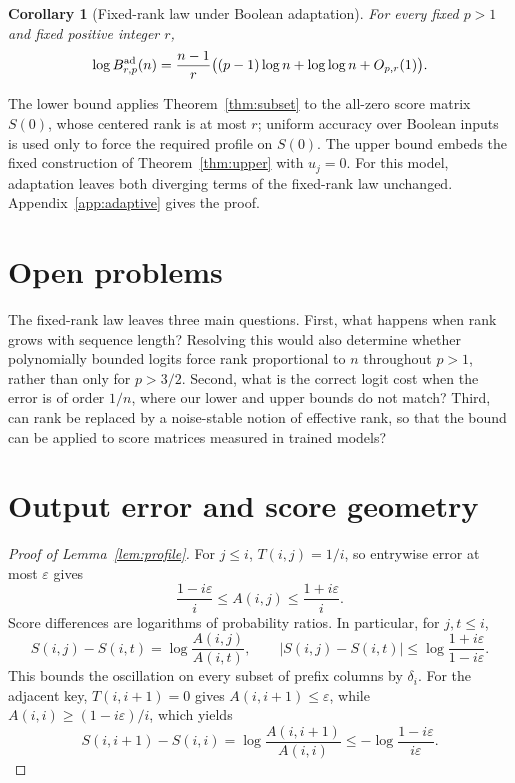 \documentclass[10pt]{article} %
\newtheorem{corollary}[theorem]{Corollary}
\theoremstyle{definition}
\begin{document}
\begin{corollary}[Fixed-rank law under Boolean adaptation]\label{cor:adaptive}
For every fixed \(p>1\) and fixed positive integer \(r\),
\[
 \log B^{\rm ad}_{r,p}(n)
 =\frac{n-1}{r}\bigl((p-1)\log n+\log\log n+O_{p,r}(1)\bigr).
\]
\end{corollary}

The lower bound applies Theorem~\ref{thm:subset} to the all-zero score matrix
\(S(0)\), whose centered rank is at most \(r\); uniform accuracy over Boolean
inputs is used only to force the required profile on \(S(0)\).  The upper
bound embeds the fixed construction of Theorem~\ref{thm:upper} with \(u_j=0\).
For this model,
adaptation leaves both diverging terms of the fixed-rank law unchanged.
Appendix~\ref{app:adaptive} gives the proof.

\section{Open problems}\label{sec:scope}

The fixed-rank law leaves three main questions.  First, what happens when rank
grows with sequence length?  Resolving this would also determine whether
polynomially bounded logits force rank proportional to \(n\) throughout
\(p>1\), rather than only for \(p>3/2\).  Second, what is the correct logit
cost when the error is of order \(1/n\), where our lower and upper bounds do
not match?  Third, can rank be replaced by a noise-stable notion of
effective rank, so that the bound can be applied to score matrices measured
in trained models?




\appendix

\section{Output error and score geometry}\label{app:profile}

\begin{proof}[Proof of Lemma~\ref{lem:profile}]
For \(j\le i\), \(T(i,j)=1/i\), so entrywise error at most \(\varepsilon\)
gives
\[
 \frac{1-i\varepsilon}{i}\le A(i,j)\le
 \frac{1+i\varepsilon}{i}.
\]
Score differences are logarithms of probability ratios.  In particular, for
\(j,t\le i\),
\[
 S(i,j)-S(i,t)=\log\frac{A(i,j)}{A(i,t)},
 \qquad
 |S(i,j)-S(i,t)|\le\log\frac{1+i\varepsilon}{1-i\varepsilon}.
\]
This bounds the oscillation on every subset of prefix columns by
\(\delta_i\).  For the adjacent key,
\(T(i,i+1)=0\) gives \(A(i,i+1)\le\varepsilon\), while
\(A(i,i)\ge(1-i\varepsilon)/i\), which yields
\[
 S(i,i+1)-S(i,i)
 =\log\frac{A(i,i+1)}{A(i,i)}
 \le-\log\frac{1-i\varepsilon}{i\varepsilon}.
\]
\end{proof}
\end{document}

